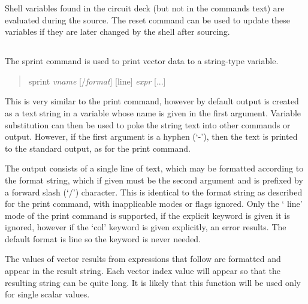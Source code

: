 Shell variables found in the circuit deck (but not in the
commands text) are evaluated during the source.  The {\cb reset}
command can be used to update these variables if they are later
changed by the shell after sourcing. 


\subsection{}
\label{sprint}


The {\cb sprint} command is used to print vector data to a string-type
variable.
\begin{quote}\vt
sprint {\it vname} [/{\it format\/}] [line] {\it expr\/} [...]
\end{quote}

This is very similar to the {\cb print} command, however by default
output is created as a text string in a variable whose name is given in
the first argument.  Variable substitution can then be used to poke the
string text into other commands or output.  However, if the first
argument is a hyphen (`-'), then the text is printed to the standard
output, as for the {\cb print} command.

The output consists of a single line of text, which may be formatted
according to the format string, which if given must be the second
argument and is prefixed by a forward slash (`/') character.  This is
identical to the format string as described for the {\cb print}
command, with inapplicable modes or flags ignored.  Only the `{\vt
line}' mode of the {\cb print} command is supported, if the explicit
keyword is given it is ignored, however if the `{\cb col}' keyword is
given explicitly, an error results.  The default format is {\vt line}
so the keyword is never needed.

The values of vector results from expressions that follow are
formatted and appear in the result string.  Each vector index value
will appear so that the resulting string can be quite long.  It is
likely that this function will be used only for single scalar values.


\subsection{}
\label{writecmd}

